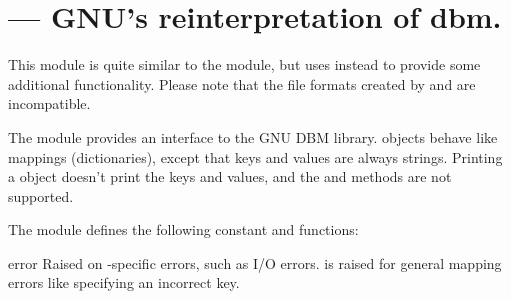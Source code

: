 \section{ ---
         GNU's reinterpretation of dbm.}



%
%

This module is quite similar to the  module, but uses 
instead to provide some additional functionality.  Please note that
the file formats created by  and  are incompatible.

The  module provides an interface to the GNU DBM
library.   objects behave like mappings
(dictionaries), except that keys and values are always strings.
Printing a  object doesn't print the keys and values, and the
 and  methods are not supported.

The module defines the following constant and functions:

\begin{excdesc}{error}
Raised on -specific errors, such as I/O errors.  is
raised for general mapping errors like specifying an incorrect key.
\end{excdesc}


